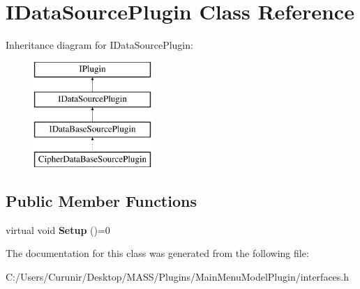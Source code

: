 \hypertarget{class_i_data_source_plugin}{}\section{I\+Data\+Source\+Plugin Class Reference}
\label{class_i_data_source_plugin}
Inheritance diagram for I\+Data\+Source\+Plugin\+:\begin{figure}[H]
\begin{center}
\leavevmode
\includegraphics[height=4.000000cm]{class_i_data_source_plugin}
\end{center}
\end{figure}
\subsection*{Public Member Functions}
\begin{DoxyCompactItemize}
\item 
\mbox{\label{class_i_data_source_plugin_afb3d43d4324e8849b1cb244c59a45987}} 
virtual void {\bfseries Setup} ()=0
\end{DoxyCompactItemize}


The documentation for this class was generated from the following file\+:\begin{DoxyCompactItemize}
\item 
C\+:/\+Users/\+Curunir/\+Desktop/\+M\+A\+S\+S/\+Plugins/\+Main\+Menu\+Model\+Plugin/interfaces.\+h\end{DoxyCompactItemize}
